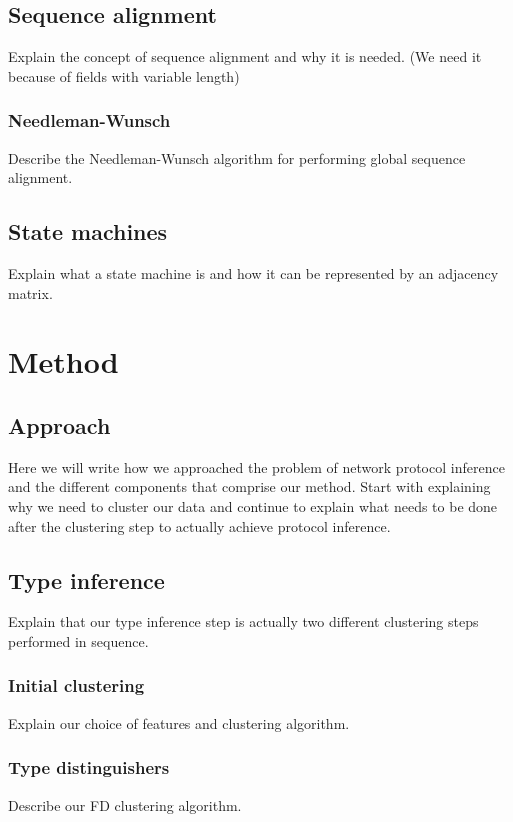 \documentclass[a4paper]{report}
\begin{document}
\section{Sequence alignment}
Explain the concept of sequence alignment and why it is needed. (We need it
because of fields with variable length)

\subsection{Needleman-Wunsch}
Describe the Needleman-Wunsch algorithm for performing global sequence
alignment.

\section{State machines}
Explain what a state machine is and how it can be represented by an adjacency
matrix.

\chapter{Method}

\section{Approach}
Here we will write how we approached the problem of network protocol inference
and the different components that comprise our method. Start with explaining
why we need to cluster our data and continue to explain what needs to be done
after the clustering step to actually achieve protocol inference.

\section{Type inference}
Explain that our type inference step is actually two different clustering steps
performed in sequence.

\subsection{Initial clustering}
Explain our choice of features and clustering algorithm.

\subsection{Type distinguishers}
Describe our FD clustering algorithm.
\end{document}
